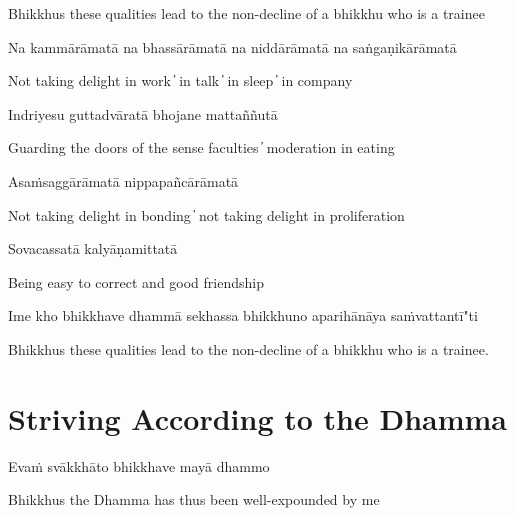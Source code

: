\begin{cprenglish}
  Bhikkhus these qualities lead to the non-decline of a bhikkhu who is a trainee
\end{cprenglish}

Na kammārāmatā na bhassārāmatā na niddārāmatā na saṅgaṇikārāmatā

\begin{cprenglish}
  Not taking delight in work  ̓  in talk  ̓  in sleep  ̓  in company
\end{cprenglish}

Indriyesu guttadvāratā bhojane mattaññutā

\begin{cprenglish}
  Guarding the doors of the sense faculties  ̓  moderation in eating
\end{cprenglish}

Asaṁsaggārāmatā nippapañcārāmatā

\begin{cprenglish}
  Not taking delight in bonding  ̓  not taking delight in proliferation
\end{cprenglish}

Sovacassatā kalyāṇamittatā

\begin{cprenglish}
  Being easy to correct and good friendship
\end{cprenglish}

Ime kho bhikkhave dhammā sekhassa bhikkhuno aparihānāya saṁvattantī"ti

\begin{cprenglish}
  Bhikkhus these qualities lead to the non-decline of a bhikkhu who is a trainee.
\end{cprenglish}

\suttaRef{[AN 6.22 \& 8.79]}

\section{Striving According to the Dhamma}

\begin{leader}
\end{leader}

Evaṁ svākkhāto bhikkhave mayā dhammo

\begin{cprenglish}
  Bhikkhus the Dhamma has thus been well-expounded by me
\end{cprenglish}

